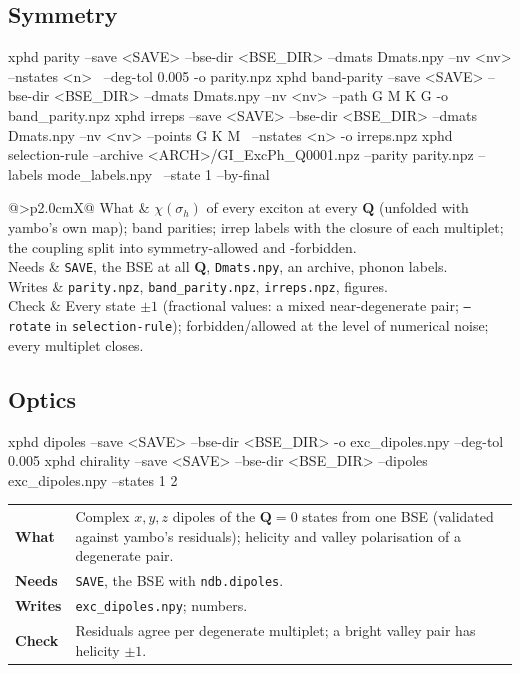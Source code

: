 \documentclass[10pt,a4paper]{article}
\makeatletter
\newcommand{\bQ}{\mathbf{Q}}
\newcommand{\step}[4]{%
  {\small\noindent\begin{tabularx}{\linewidth}{@{}>{\bfseries\leavevmode\color{accent}}p{2.0cm}X@{}}
  What & #1\\ Needs & #2\\ Writes & #3\\ Check & #4\end{tabularx}\par}\vspace{1.0ex}}
\makeatother
\begin{document}
\subsection{Symmetry}
\begin{cmd}
xphd parity --save <SAVE> --bse-dir <BSE_DIR> --dmats Dmats.npy --nv <nv> --nstates <n> \
            --deg-tol 0.005 -o parity.npz
xphd band-parity --save <SAVE> --bse-dir <BSE_DIR> --dmats Dmats.npy --nv <nv> --path G M K G -o band_parity.npz
xphd irreps --save <SAVE> --bse-dir <BSE_DIR> --dmats Dmats.npy --nv <nv> --points G K M \
            --nstates <n> -o irreps.npz
xphd selection-rule --archive <ARCH>/GI_ExcPh_Q0001.npz --parity parity.npz --labels mode_labels.npy \
                    --state 1 --by-final
\end{cmd}
\step{$\chi(\sigma_h)$ of every exciton at every $\bQ$ (unfolded with yambo's own map); band parities; irrep labels with the closure
of each multiplet; the coupling split into symmetry-allowed and -forbidden.}
{\texttt{SAVE}, the BSE at all $\bQ$, \texttt{Dmats.npy}, an archive, phonon labels.}
{\texttt{parity.npz}, \texttt{band\_parity.npz}, \texttt{irreps.npz}, figures.}
{Every state $\pm1$ (fractional values: a mixed near-degenerate pair; \texttt{--rotate} in \texttt{selection-rule});
forbidden/allowed at the level of numerical noise; every multiplet closes.}

\subsection{Optics}
\begin{cmd}
xphd dipoles --save <SAVE> --bse-dir <BSE_DIR> -o exc_dipoles.npy --deg-tol 0.005
xphd chirality --save <SAVE> --bse-dir <BSE_DIR> --dipoles exc_dipoles.npy --states 1 2
\end{cmd}
\step{Complex $x,y,z$ dipoles of the $\bQ=0$ states from one BSE (validated against yambo's residuals); helicity and valley
polarisation of a degenerate pair.}{\texttt{SAVE}, the BSE with \texttt{ndb.dipoles}.}{\texttt{exc\_dipoles.npy}; numbers.}
{Residuals agree per degenerate multiplet; a bright valley pair has helicity $\pm1$.}
\end{document}
